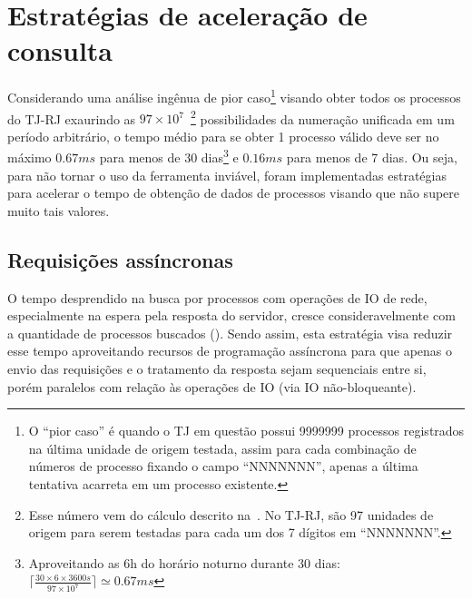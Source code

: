\section{Estratégias de aceleração de consulta}

Considerando uma análise ingênua de pior caso\footnote{O ``pior caso'' é quando
o TJ em questão possui 9999999 processos registrados na última unidade de
origem testada, assim para cada combinação de números de processo fixando o
campo ``NNNNNNN'', apenas a última tentativa acarreta em um processo
existente.} visando obter todos os processos do TJ-RJ exaurindo as $97
\times 10^{7}$~\footnote{Esse número vem do cálculo descrito
na~. No TJ-RJ, são 97 unidades de origem
para serem testadas para cada um dos 7 dígitos em ``NNNNNNN''.} possibilidades
da numeração unificada em um período arbitrário, o tempo médio para se obter 1
processo válido deve ser no máximo $0.67ms$ para menos de 30
dias\footnote{Aproveitando as 6h do horário noturno durante 30 dias: $\lceil
\frac{30 \times 6 \times 3600s}{97 \times 10^7} \rceil \simeq 0.67ms$} e
$0.16ms$ para menos de 7 dias. Ou seja, para não tornar o uso da ferramenta
inviável, foram implementadas estratégias para acelerar o tempo de obtenção de
dados de processos visando que não supere muito tais valores.

\subsection{Requisições assíncronas~\label{sub:requisições-assíncronas}}

O tempo desprendido na busca por processos com operações de IO de rede,
especialmente na espera pela resposta do servidor, cresce consideravelmente com
a quantidade de processos buscados ().
Sendo assim, esta estratégia visa reduzir esse tempo aproveitando recursos de
programação assíncrona para que apenas o envio das requisições e o tratamento
da resposta sejam sequenciais entre si, porém paralelos com relação às
operações de IO (via IO não-bloqueante).

